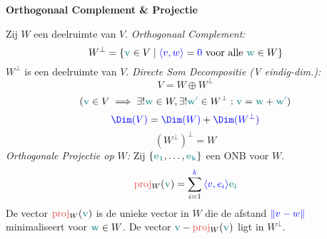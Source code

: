 \documentclass[12pt]{article}
\renewcommand{\vec}[1]{\textcolor{vectorTeal}{\mathbf{#1}}}
\newcommand{\scalar}[1]{\textcolor{scalarBrightBlue}{#1}}
\newcommand{\mat}[1]{\textcolor{matrixSoftRed}{#1}}
\newcommand{\innerprod}[2]{\scalar{\langle #1, #2 \rangle}}
\newcommand{\norm}[1]{\scalar{\| #1 \|}}
\DeclareMathOperator{\proj}{proj}
\begin{document}
\vspace{1.5em} %
{\centering
\textcolor{headerBrown}{\large\textbf{Orthogonaal Complement & Projectie}}
\par
}%
Zij $W$ een deelruimte van $V$.
\textit{Orthogonaal Complement:}
\[
W^{\perp} = \{ \vec{v} \in V \mid \innerprod{v}{w} = \scalar{0} \text{ voor alle } \vec{w} \in W \}
\]
$W^{\perp}$ is een deelruimte van $V$.
\textit{Directe Som Decompositie (V eindig-dim.):}
\[
V = W \oplus W^{\perp}
\]
\[
(\vec{v} \in V \implies \exists! \vec{w} \in W, \exists! \vec{w'} \in W^{\perp} : \vec{v} = \vec{w} + \vec{w'})
\]
\[
\scalar{\Dim(V)} = \scalar{\Dim(W)} + \scalar{\Dim(W^{\perp})}
\]
\[
(W^{\perp})^{\perp} = W
\]
\textit{Orthogonale Projectie op $W$:} Zij $\{\vec{e_1}, \dots, \vec{e_k}\}$ een ONB voor $W$.
\[
\mat{\proj}_W(\vec{v}) = \sum_{i=1}^{\scalar{k}} \innerprod{v}{e_i} \vec{e_i}
\]
De vector $\mat{\proj}_W(\vec{v})$ is de unieke vector in $W$ die de afstand $\norm{v - w}$ minimaliseert voor $\vec{w} \in W$.
De vector $\vec{v} - \mat{\proj}_W(\vec{v})$ ligt in $W^{\perp}$.
\end{document}
